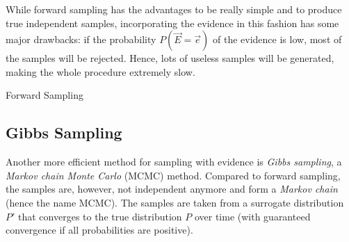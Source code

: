 			While forward sampling has the advantages to be really simple and to produce true independent samples, incorporating the evidence in this fashion has some major drawbacks: if the probability \( P(\vec{E} = \vec{e}) \) of the evidence is low, most of the samples will be rejected. Hence, lots of useless samples will be generated, making the whole procedure extremely slow.

			\begin{algorithm}  \DontPrintSemicolon
				\caption{Forward Sampling}
				\label{alg:forwardSampling}
			\end{algorithm}

		\subsection{Gibbs Sampling}
			Another more efficient method for sampling with evidence is \emph{Gibbs sampling}, a \emph{Markov chain Monte Carlo} (MCMC) method. Compared to forward sampling, the samples are, however, not independent anymore and form a \emph{Markov chain} (hence the name MCMC). The samples are taken from a surrogate distribution \(P'\) that converges to the true distribution \(P\) over time (with guaranteed convergence if all probabilities are positive).

